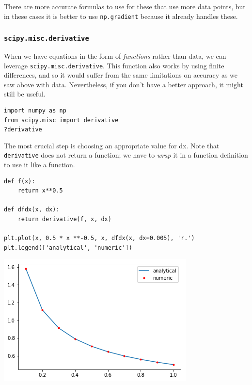 \documentclass[11pt]{article}
\begin{document}
There are more accurate formulas to use for these that use more data points, but in these cases it is better to use \texttt{np.gradient} because it already handles these.

\subsubsection{\texttt{scipy.misc.derivative}}
\label{sec:org7af42b2}

When we have equations in the form of \emph{functions} rather than data, we can leverage \texttt{scipy.misc.derivative}. This function also works by using finite differences, and so it would suffer from the same limitations on accuracy as we saw above with data. Nevertheless, if you don't have a better approach, it might still be useful.

\begin{verbatim}
import numpy as np
from scipy.misc import derivative
?derivative
\end{verbatim}


The most crucial step is choosing an appropriate value for dx. Note that \texttt{derivative} does not return a function; we have to \emph{wrap} it in a function definition to use it like a function.

\begin{verbatim}
def f(x):
    return x**0.5

def dfdx(x, dx):
    return derivative(f, x, dx)

plt.plot(x, 0.5 * x **-0.5, x, dfdx(x, dx=0.005), 'r.')
plt.legend(['analytical', 'numeric'])
\end{verbatim}

\begin{center}
\includegraphics[width=.9\linewidth]{obipy-resources/7b778712de6ec6a237e88377d645bb2e-78386p-N.png}
\end{center}
\end{document}
